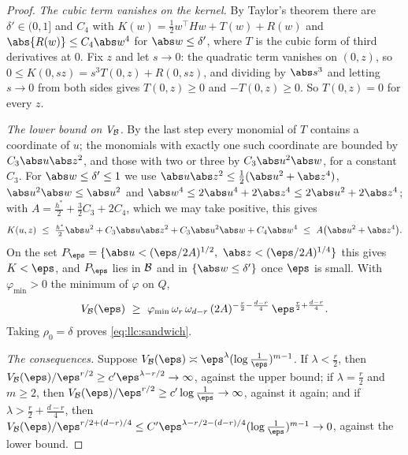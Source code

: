 \begin{refsection}
\begin{proof}
\emph{The cubic term vanishes on the kernel.} By Taylor's theorem there are $\delta'\in(0,1]$ and $C_4$ with $K(w)=\tfrac12w^\top Hw+T(w)+R(w)$ and $\abs{R(w)}\le C_4\abs w^4$ for $\abs w\le\delta'$, where $T$ is the cubic form of third derivatives at $0$. Fix $z$ and let $s\to0$: the quadratic term vanishes on $(0,z)$, so $0\le K(0,sz)=s^3T(0,z)+R(0,sz)$, and dividing by $\abs s^3$ and letting $s\to0$ from both sides gives $T(0,z)\ge0$ and $-T(0,z)\ge0$. So $T(0,z)=0$ for every $z$.

\emph{The lower bound on $V_{\mathcal{B}}$.} By the last step every monomial of $T$ contains a coordinate of $u$; the monomials with exactly one such coordinate are bounded by $C_3\abs u\abs z^2$, and those with two or three by $C_3\abs u^2\abs w$, for a constant $C_3$. For $\abs w\le\delta'\le1$ we use $\abs u\abs z^2\le\tfrac12(\abs u^2+\abs z^4)$, $\abs u^2\abs w\le\abs u^2$ and $\abs w^4\le2\abs u^4+2\abs z^4\le2\abs u^2+2\abs z^4$; with $A=\tfrac{h^*}2+\tfrac32C_3+2C_4$, which we may take positive, this gives
\[
K(u,z)\ \le\ \tfrac{h^*}2\abs u^2+C_3\abs u\abs z^2+C_3\abs u^2\abs w+C_4\abs w^4\ \le\ A\bigl(\abs u^2+\abs z^4\bigr).
\]
On the set $P_\eps=\{\abs u<(\eps/2A)^{1/2},\ \abs z<(\eps/2A)^{1/4}\}$ this gives $K<\eps$, and $P_\eps$ lies in $\mathcal{B}$ and in $\{\abs w\le\delta'\}$ once $\eps$ is small. With $\varphi_{\min}>0$ the minimum of $\varphi$ on $Q$,
\[
V_{\llcB}(\eps)\ \ge\ \varphi_{\min}\,\omega_r\,\omega_{d-r}\,(2A)^{-\frac r2-\frac{d-r}4}\,\eps^{\frac r2+\frac{d-r}4}.
\]
Taking $\rho_0=\delta$ proves \eqref{eq:llc:sandwich}.

\emph{The consequences.} Suppose $V_{\llcB}(\eps)\asymp\eps^{\lambda}(\log\frac1\eps)^{m-1}$. If $\lambda<\tfrac r2$, then $V_{\llcB}(\eps)/\eps^{r/2}\ge c'\eps^{\lambda-r/2}\to\infty$, against the upper bound; if $\lambda=\tfrac r2$ and $m\ge2$, then $V_{\llcB}(\eps)/\eps^{r/2}\ge c'\log\frac1\eps\to\infty$, against it again; and if $\lambda>\tfrac r2+\tfrac{d-r}4$, then $V_{\llcB}(\eps)/\eps^{r/2+(d-r)/4}\le C'\eps^{\lambda-r/2-(d-r)/4}(\log\frac1\eps)^{m-1}\to0$, against the lower bound.
\end{proof}


\end{refsection}
